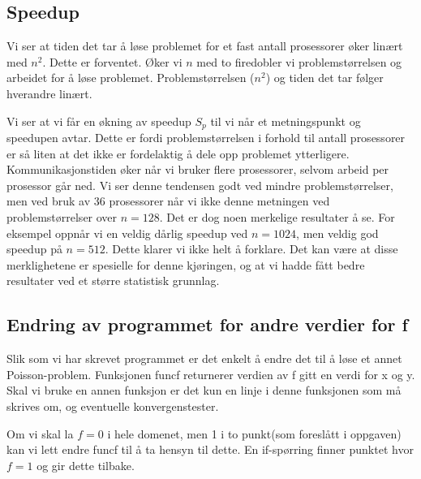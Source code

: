 \documentclass[11pt,norsk,a4paper]{article}
\begin{document}
\subsection{Speedup}

Vi ser at tiden det tar å løse problemet for et fast antall prosessorer øker linært med $n^2$. Dette er forventet. Øker vi $n$ med to firedobler vi problemstørrelsen og arbeidet for å løse problemet. Problemstørrelsen ($n^2$) og tiden det tar følger hverandre linært.

Vi ser at vi får en økning av speedup $S_p$ til vi når et metningspunkt og speedupen avtar. Dette er fordi problemstørrelsen i forhold til antall prosessorer er så liten at det ikke er fordelaktig å dele opp problemet ytterligere. Kommunikasjonstiden øker når vi bruker flere prosessorer, selvom arbeid per prosessor går ned. Vi ser denne tendensen godt ved mindre problemstørrelser, men ved bruk av 36 prosessorer når vi ikke denne metningen ved problemstørrelser over $n=128$. Det er dog noen merkelige resultater å se. For eksempel oppnår vi en veldig dårlig speedup ved $n=1024$, men veldig god speedup på $n=512$. Dette klarer vi ikke helt å forklare. Det kan være at disse merklighetene er spesielle for denne kjøringen, og at vi hadde fått bedre resultater ved et større statistisk grunnlag.

\subsection{Endring av programmet for andre verdier for f}
Slik som vi har skrevet programmet er det enkelt å endre det til å løse et annet Poisson-problem. Funksjonen funcf returnerer verdien av f gitt en verdi for x og y. Skal vi bruke en annen funksjon er det kun en linje i denne funksjonen som må skrives om, og eventuelle konvergenstester.

Om vi skal la $f=0$ i hele domenet, men 1 i to punkt(som foreslått i oppgaven) kan vi lett endre funcf til å ta hensyn til dette. En if-spørring finner punktet hvor $f=1$ og gir dette tilbake.
\end{document}
